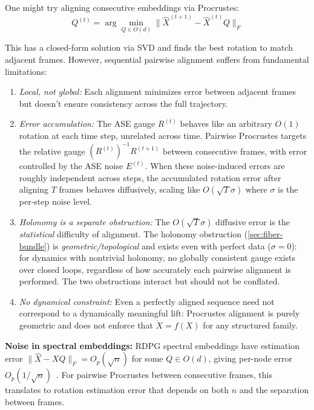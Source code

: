 \documentclass{article}
\theoremstyle{plain}
\theoremstyle{definition}
\theoremstyle{remark}
\begin{document}
One might try aligning consecutive embeddings via Procrustes:
\begin{equation}
Q^{(t)} = \arg \min_{Q \in O(d)} \|\hat{X}^{(t+1)} - \hat{X}^{(t)} Q\|_F
\end{equation}

This has a closed-form solution via SVD and finds the best rotation to match adjacent frames.
However, sequential pairwise alignment suffers from fundamental limitations:

\begin{enumerate}
\item \emph{Local, not global:} Each alignment minimizes error between adjacent frames but doesn't ensure consistency across the full trajectory.

\item \emph{Error accumulation:} The ASE gauge $R^{(t)}$ behaves like an arbitrary $O(1)$ rotation at each time step, unrelated across time. Pairwise Procrustes targets the relative gauge $(R^{(t)})^{-1} R^{(t+1)}$ between consecutive frames, with error controlled by the ASE noise $E^{(t)}$. When these noise-induced errors are roughly independent across steps, the accumulated rotation error after aligning $T$ frames behaves diffusively, scaling like $O(\sqrt{T} \sigma)$ where $\sigma$ is the per-step noise level.

\item \emph{Holonomy is a separate obstruction:} The $O(\sqrt{T} \sigma)$ diffusive error is the \emph{statistical} difficulty of alignment. The holonomy obstruction (\cref{sec:fiber-bundle}) is \emph{geometric/topological} and exists even with perfect data ($\sigma = 0$): for dynamics with nontrivial holonomy, no globally consistent gauge exists over closed loops, regardless of how accurately each pairwise alignment is performed. The two obstructions interact but should not be conflated.

\item \emph{No dynamical constraint:} Even a perfectly aligned sequence need not correspond to a dynamically meaningful lift: Procrustes alignment is purely geometric and does not enforce that $\dot{X} = f(X)$ for any structured family.
\end{enumerate}

\textbf{Noise in spectral embeddings:}
RDPG spectral embeddings have estimation error $\|\hat{X} - XQ\|_F = O_p(\sqrt{n})$ for some $Q \in O(d)$, giving per-node error $O_p(1/\sqrt{n})$~\citep{athreya2017statistical,cape2019two}.
For pairwise Procrustes between consecutive frames, this translates to rotation estimation error that depends on both $n$ and the separation between frames.
\end{document}
